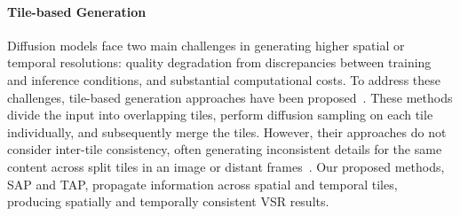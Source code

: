 \paragraph{Tile-based Generation}
Diffusion models face two main challenges in generating higher spatial or temporal resolutions: quality degradation from discrepancies between training and inference conditions, and substantial computational costs. To address these challenges, tile-based generation approaches have been proposed~\cite{multidiffusion2023,syncdiffusion2023,demofusion2024,zhou2024upscaleavideo,yang2023mgldvsr}. These methods divide the input into overlapping tiles, perform diffusion sampling on each tile individually, and subsequently merge the tiles. However, their approaches do not consider inter-tile consistency, often generating inconsistent details for the same content across split tiles in an image or distant frames~\cite{zhou2024upscaleavideo,yang2023mgldvsr}.
Our proposed methods, SAP and TAP, propagate information across spatial and temporal tiles, producing spatially and temporally consistent VSR results.